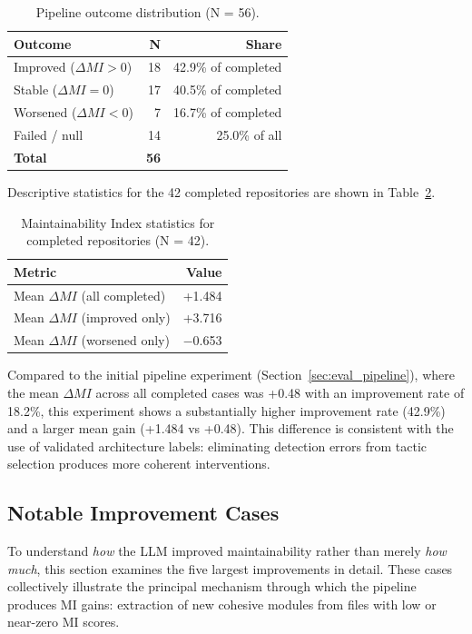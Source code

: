 \documentclass[sigconf,review,anonymous]{acmart}
\begin{document}
\begin{table}[H]
\centering
\small
\caption{Pipeline outcome distribution (N = 56).}
\label{tab:exp5_outcomes}
\begin{tabular}{lrr}
\toprule
\textbf{Outcome} & \textbf{N} & \textbf{Share} \\
\midrule
Improved ($\Delta MI > 0$)  & 18 & 42.9\% of completed \\
Stable ($\Delta MI = 0$)    & 17 & 40.5\% of completed \\
Worsened ($\Delta MI < 0$)  & 7  & 16.7\% of completed \\
Failed / null               & 14 & 25.0\% of all \\
\midrule
\textbf{Total} & \textbf{56} & \\
\bottomrule
\end{tabular}
\end{table}

Descriptive statistics for the 42 completed repositories are shown in Table~\ref{tab:exp5_mi}.

\begin{table}[H]
\centering
\small
\caption{Maintainability Index statistics for completed repositories (N = 42).}
\label{tab:exp5_mi}
\begin{tabular}{lr}
\toprule
\textbf{Metric} & \textbf{Value} \\
\midrule
Mean $\Delta MI$ (all completed)  & +1.484 \\
Mean $\Delta MI$ (improved only)  & +3.716 \\
Mean $\Delta MI$ (worsened only)  & $-$0.653 \\
\bottomrule
\end{tabular}
\end{table}

Compared to the initial pipeline experiment (Section~\ref{sec:eval_pipeline}), where the mean $\Delta MI$ across all completed cases was +0.48 with an improvement rate of 18.2\%, this experiment shows a substantially higher improvement rate (42.9\%) and a larger mean gain (+1.484 vs +0.48). This difference is consistent with the use of validated architecture labels: eliminating detection errors from tactic selection produces more coherent interventions.

\subsection{Notable Improvement Cases}
\label{subsec:exp5_cases}

To understand \textit{how} the LLM improved maintainability rather than merely \textit{how much}, this section examines the five largest improvements in detail. These cases collectively illustrate the principal mechanism through which the pipeline produces MI gains: extraction of new cohesive modules from files with low or near-zero MI scores.
\end{document}
